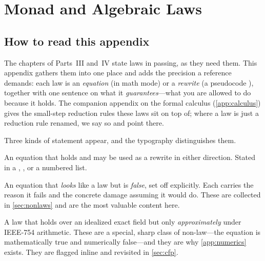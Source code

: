 \chapter{Monad and Algebraic Laws}
\label{app:laws}


\section{How to read this appendix}
\label{sec:cread}

The chapters of Parts~III and~IV state laws in passing, as they need them. This
appendix gathers them into one place and adds the precision a reference demands: each
law is an \emph{equation} (in math mode) or a \emph{rewrite} (a pseudocode
\code{==}), together with one sentence on what it \emph{guarantees}---what you are
allowed to do because it holds. The companion appendix on the formal calculus
(\cref{app:calculus}) gives the small-step reduction rules these laws sit on top of;
where a law is just a reduction rule renamed, we say so and point there.

Three kinds of statement appear, and the typography distinguishes them.

\begin{description}[style=nextline, leftmargin=0pt, font=\normalfont\itshape]
  \item[A law.] An equation that holds and may be used as a rewrite in either
  direction. Stated in a , , or a numbered list.
  \item[A non-law.] An equation that \emph{looks} like a law but is \emph{false}, set
  off explicitly. Each carries the reason it fails and the concrete damage assuming
  it would do. These are collected in \cref{sec:nonlaws} and are the most valuable
  content here.
  \item[A floating-point caveat.] A law that holds over an idealized exact field but
  only \emph{approximately} under IEEE-754 arithmetic. These are a special, sharp
  class of non-law---the equation is mathematically true and numerically false---and
  they are why \cref{app:numerics} exists. They are flagged inline and revisited in
  \cref{sec:cfp}.
\end{description}

